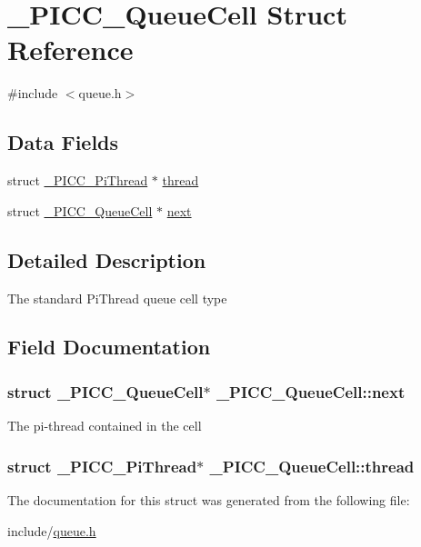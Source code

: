 \hypertarget{struct__PICC__QueueCell}{\section{\-\_\-\-P\-I\-C\-C\-\_\-\-Queue\-Cell Struct Reference}
\label{struct__PICC__QueueCell}
}


{\ttfamily \#include $<$queue.\-h$>$}

\subsection*{Data Fields}
{\bf }\par
\begin{DoxyCompactItemize}
\item 
struct \hyperlink{struct__PICC__PiThread}{\-\_\-\-P\-I\-C\-C\-\_\-\-Pi\-Thread} $\ast$ \hyperlink{struct__PICC__QueueCell_a27273ca322981782b3c2d4e6f29faab5}{thread}
\item 
struct \hyperlink{struct__PICC__QueueCell}{\-\_\-\-P\-I\-C\-C\-\_\-\-Queue\-Cell} $\ast$ \hyperlink{struct__PICC__QueueCell_a7c313e207b14c99a883c88ebf024440b}{next}
\end{DoxyCompactItemize}



\subsection{Detailed Description}
The standard Pi\-Thread queue cell type 

\subsection{Field Documentation}
\hypertarget{struct__PICC__QueueCell_a7c313e207b14c99a883c88ebf024440b}{
\subsubsection[{next}]{\setlength{\rightskip}{0pt plus 5cm}struct {\bf \-\_\-\-P\-I\-C\-C\-\_\-\-Queue\-Cell}$\ast$ \-\_\-\-P\-I\-C\-C\-\_\-\-Queue\-Cell\-::next}}\label{struct__PICC__QueueCell_a7c313e207b14c99a883c88ebf024440b}
The pi-\/thread contained in the cell \hypertarget{struct__PICC__QueueCell_a27273ca322981782b3c2d4e6f29faab5}{
\subsubsection[{thread}]{\setlength{\rightskip}{0pt plus 5cm}struct {\bf \-\_\-\-P\-I\-C\-C\-\_\-\-Pi\-Thread}$\ast$ \-\_\-\-P\-I\-C\-C\-\_\-\-Queue\-Cell\-::thread}}\label{struct__PICC__QueueCell_a27273ca322981782b3c2d4e6f29faab5}


The documentation for this struct was generated from the following file\-:\begin{DoxyCompactItemize}
\item 
include/\hyperlink{queue_8h}{queue.\-h}\end{DoxyCompactItemize}
